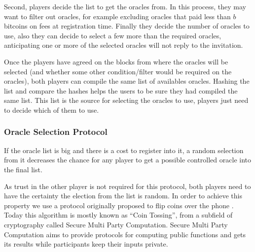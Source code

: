 Second, players decide the list to get the oracles from.
In this process, they may want to filter out oracles, for example excluding
  oracles that paid less than $b$ bitcoins on fees at registration time.
Finally they decide the number of oracles to use, also they can decide to
  select a few more than the required oracles, anticipating one or more of
  the selected oracles will not reply to the invitation.

Once the players have agreed on the blocks from where the oracles will be
  selected (and whether some other condition/filter would be required on the
  oracles), both players can compile the same list of availables oracles.
Hashing the list and compare the hashes helps the users to be sure they had
  compiled the same list.
This list is the source for selecting the oracles to use, players just need to
  decide which of them to use.

\subsubsection{Oracle Selection Protocol}

If the oracle list is big and there is a cost to register into it, a random
  selection from it decreases the chance for any player to get a possible
  controlled oracle into the final list.

As trust in the other player is not required for this protocol, both players
need to have the certainty the election from the list is random.
In order to achieve this property we use a protocol originally proposed to flip
  coins over the phone \cite{blum1983coin}.
Today this algorithm is mostly known as ``Coin Tossing'', from a subfield of
  cryptography called Secure Multi Party Computation.
Secure Multi Party Computation aims to provide protocols for computing public
  functions and gets its results while participants keep their inputs private.

